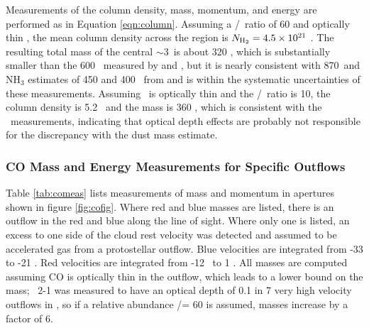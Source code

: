 Measurements of the column density, mass, momentum, and energy are performed as
in Equation \ref{eqn:column}.  Assuming a \twelveco/\thirteenco\ ratio of 60
\citep{lucas1998} and optically thin \thirteenco, the mean column density
across the region is $N_{\textrm{H}_{2}} = 4.5\times10^{21}$ \persc.  The resulting total
mass of the central $\sim3$\arcmin\ is about 320 \msun, which is substantially
smaller than the 600 \msun\ measured by \citet{beuther2002} and
\citet{Zinchenko1997}, but it is nearly consistent with 870\um\ and NH$_3$
estimates of 450 and 400 \msun\ from \citet{Mao2004} and is within the
systematic uncertainties of these measurements.  Assuming \ceighteeno\ is
optically thin and the \ceighteeno/\thirteenco\ ratio is 10, the 
column density is 5.2 \persc\ and the mass is 360 \msun, which is
consistent with the \thirteenco\ measurements, indicating that optical depth
effects are probably not responsible for the discrepancy with the dust mass
estimate.



\subsubsection{CO Mass and Energy Measurements for Specific Outflows}


Table \ref{tab:comeas} lists measurements of mass and momentum in
apertures shown in figure \ref{fig:cofig}.  Where red and blue masses are
listed, there is an outflow in the red and blue along the line of sight.  Where
only one is listed, an excess to one side of the cloud rest velocity was
detected and assumed to be accelerated gas from a protostellar outflow.  Blue
velocities are integrated from -33 to -21 \kms.  Red velocities are integrated
from -12 \kms\ to 1 \kms.  All masses are computed assuming CO is optically
thin in the outflow, which leads to a lower bound on the mass; \thirteenco\ 2-1 was
measured to have an optical depth of 0.1 in 7 very high velocity outflows in
\citet{choi1993}, so if a relative abundance \twelveco/\thirteenco =
60 is assumed\citep{lucas1998}, masses increase by a factor of 6.

